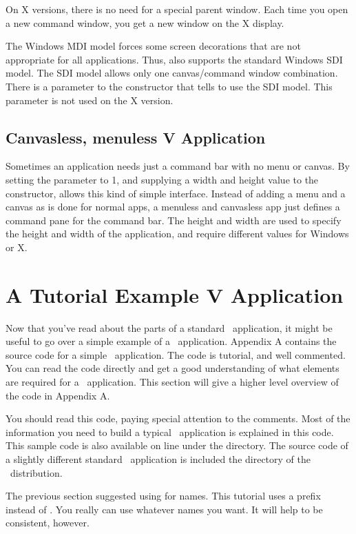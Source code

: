 On X versions, there is no need for a special parent window.
Each time you open a new command window, you get a new window
on the X display.

The Windows MDI model forces some screen decorations that
are not appropriate for all applications. Thus, \V also supports
the standard Windows SDI model. The SDI model allows only one
canvas/command window combination. There is a parameter to
the  constructor that tells \V to use the SDI model.
This parameter is not used on the X version.

\subsection*{Canvasless, menuless V Application}

Sometimes an application needs just a command bar with no menu or
canvas. By setting the  parameter to 1, and
supplying a width and height value to the 
constructor, \V allows this kind of simple interface. Instead of
adding a menu and a canvas as is done for normal \V apps, a
menuless and canvasless app just defines a command pane for the
command bar. The height and width are used to specify the height
and width of the application, and require different values for
Windows or X.

\section{A Tutorial Example V Application}
\label{sec:tutexamp}

Now that you've read about the parts of a standard \V\
application, it might be useful to go over a simple example of a
\V\ application. Appendix A contains the source code for a simple
\V\ application. The code is tutorial, and well commented. You
can read the code directly and get a good understanding of what
elements are required for a \V\ application. This section will
give a higher level overview of the code in Appendix A.

You should read this code, paying special attention to the comments.
Most of the information you need to build a typical \V\
application is explained in this code. This sample code is also
available on line under the \code{\tild/v/tutor} directory.
The source code of a slightly different standard \V\ application
is included the \code{\tild/v/examp} directory of the \V\
distribution.

The previous section suggested using \code{myApp} for names. This
tutorial uses a  prefix instead of . You really
can use whatever names you want. It will help to be consistent,
however.

